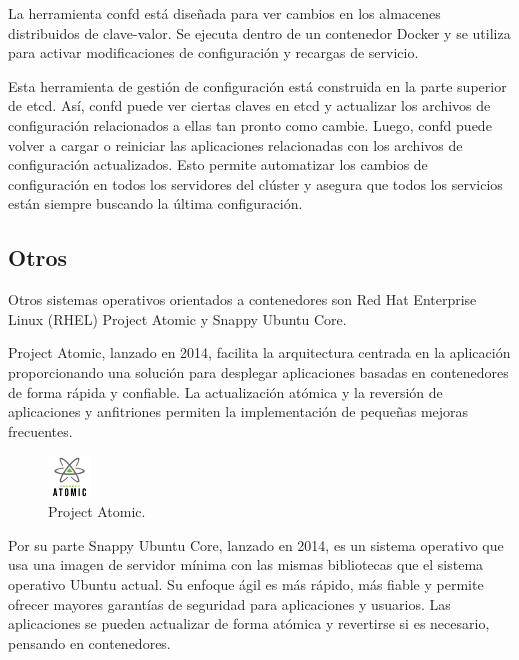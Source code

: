 La herramienta confd está diseñada para ver cambios en los almacenes distribuidos de clave-valor. Se ejecuta dentro de un contenedor Docker y se utiliza para activar modificaciones de configuración y recargas de servicio.

Esta herramienta de gestión de configuración está construida en la parte superior de etcd. Así, confd puede ver ciertas claves en etcd y actualizar los archivos de configuración relacionados a ellas tan pronto como cambie. Luego, confd puede volver a cargar o reiniciar las aplicaciones relacionadas con los archivos de configuración actualizados. Esto permite automatizar los cambios de configuración en todos los servidores del clúster y asegura que todos los servicios están siempre buscando la última configuración.

\subsection{Otros}

Otros sistemas operativos orientados a contenedores son Red Hat Enterprise Linux (RHEL) Project Atomic\cite{rhel7} y Snappy Ubuntu Core\cite{ubuntucore}.

Project Atomic, lanzado en 2014, facilita la arquitectura centrada en la aplicación proporcionando una solución para desplegar aplicaciones basadas en contenedores de forma rápida y confiable. La actualización atómica y la reversión de aplicaciones y anfitriones permiten la implementación de pequeñas mejoras frecuentes.

\begin{figure}[H]
\centering
\includegraphics[width=0.1\textwidth]{images/figures/projectatomic.png}
\caption{Project Atomic.\footnotemark}
\end{figure}


Por su parte Snappy Ubuntu Core, lanzado en 2014, es un sistema operativo que usa una imagen de servidor mínima con las mismas bibliotecas que el sistema operativo Ubuntu actual. Su enfoque ágil es más rápido, más fiable y permite ofrecer mayores garantías de seguridad para aplicaciones y usuarios. Las aplicaciones se pueden actualizar de forma atómica y revertirse si es necesario, pensando en contenedores.

